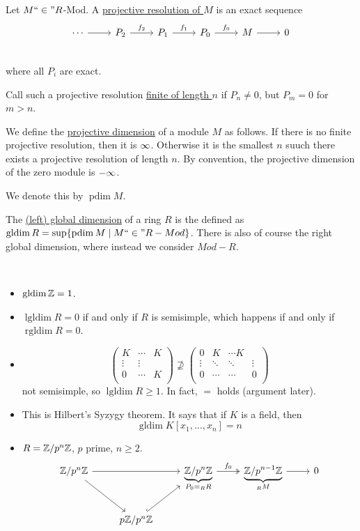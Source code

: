 \documentclass[x11names,reqno,14pt]{extarticle}
\newcommand{\fin}{``\in"}
\DeclareMathOperator{\pdim}{pdim}
\DeclareMathOperator{\gldim}{gldim}
\DeclareMathOperator{\lgldim}{lgldim}
\DeclareMathOperator{\rgldim}{rgldim}
\begin{document}

Let $M\fin R$-Mod. A \underline{projective resolution of $M$} is an exact sequence
\[
\begin{tikzcd}
\cdots\ar[r]&P_2\ar[r, "f_2"]&P_1\ar[r, "f_1"]&P_0\ar[r, "f_0"]&M\ar[r]&0 \\
\end{tikzcd}
\]
where all $P_i$ are exact. 

Call such a projective resolution \underline{finite of length $n$} if $P_n\neq0$, but $P_m =0$ for $m > n$. 


We define the \underline{projective dimension} of a module $M$ as follows. If there is no finite projective resolution, then it is $\infty$. Otherwise it is the smallest $n$ suuch there exists a projective resolution of length $n$. By convention, the projective dimension of the zero module is $-\infty$. 

We denote this by $\pdim M$. 

The \underline{(left) global dimension} of a ring $R$ is the defined as $\gldim R = \sup\{\pdim M \mid M\fin R-Mod\}$. There is also of course the right global dimension, where instead we consider $Mod-R$. 

\exm\,

\begin{itemize}

\item $\gldim\Z = 1$.

\item $\lgldim R = 0$ if and only if $R$ is semisimple, which happens if and only if $\rgldim R = 0$. 

\item 
\[
\begin{pmatrix}
K&\cdots&K \\
\vdots & \vdots \\
0 & \cdots & K \\
\end{pmatrix}  \not\supseteq \begin{pmatrix} 0 & K & \cdots K \\ 
\vdots & \ddots & \ddots & \vdots \\
0 & \cdots & \cdots & 0 \\
\end{pmatrix}
\]
not semisimple, so $\lgldim R \geq 1$. In fact, $=$ holds (argument later). 

\item This is Hilbert's Syzygy theorem. It says that if $K$ is a field, then 
\[
\gldim K[x_1, \dots, x_n] = n
\]
 

\item $R = \mathbb{Z}/p^n\mathbb{Z}$, $p$ prime, $n\geq2$. 
\[
\begin{tikzcd}
\Z/p^n\Z\ar[rr]\ar[dr]&& \underbrace{\Z/p^n\Z}_{P_0=_RR}\ar[r, twoheadrightarrow, "f_0"]&\underbrace{\Z/p^{n - 1}\Z}_{_RM}\ar[r]&0 \\
&p\Z/p^n\Z \ar[ur, hook] & \\
\end{tikzcd}
\]


\end{itemize}
\end{document}
